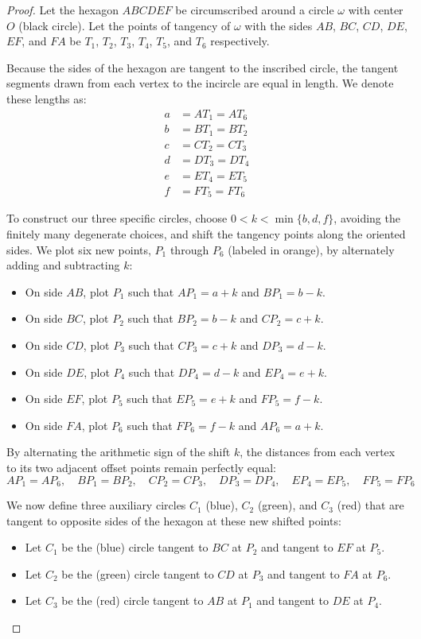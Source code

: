 \documentclass[reqno]{amsart}
\DeclareMathOperator{\1}{\textbf{1}}
\begin{document}
\begin{proof}


    Let the hexagon $ABCDEF$ be circumscribed around a circle $\omega$ with center $O$ (black circle). Let the points of tangency of $\omega$ with the sides $AB$, $BC$, $CD$, $DE$, $EF$, and $FA$ be $T_1$, $T_2$, $T_3$, $T_4$, $T_5$, and $T_6$ respectively.

Because the sides of the hexagon are tangent to the inscribed circle, the tangent segments drawn from each vertex to the incircle are equal in length. We denote these lengths as:
\begin{align*}
    a &= AT_1 = AT_6 \\
    b &= BT_1 = BT_2 \\
    c &= CT_2 = CT_3 \\
    d &= DT_3 = DT_4 \\
    e &= ET_4 = ET_5 \\
    f &= FT_5 = FT_6
\end{align*}

To construct our three specific circles, choose
$0<k<\min\{b,d,f\}$, avoiding the finitely many degenerate choices, and shift
the tangency points along the oriented sides. We plot six new points, $P_1$
through $P_6$ (labeled in orange), by alternately adding and subtracting $k$:
\begin{itemize}
    \item On side $AB$, plot $P_1$ such that $AP_1 = a + k$ and $BP_1 = b - k$.
    \item On side $BC$, plot $P_2$ such that $BP_2 = b - k$ and $CP_2 = c + k$.
    \item On side $CD$, plot $P_3$ such that $CP_3 = c + k$ and $DP_3 = d - k$.
    \item On side $DE$, plot $P_4$ such that $DP_4 = d - k$ and $EP_4 = e + k$.
    \item On side $EF$, plot $P_5$ such that $EP_5 = e + k$ and $FP_5 = f - k$.
    \item On side $FA$, plot $P_6$ such that $FP_6 = f - k$ and $AP_6 = a + k$.
\end{itemize}

By alternating the arithmetic sign of the shift $k$, the distances from each vertex to its two adjacent offset points remain perfectly equal: 
\[ AP_1 = AP_6, \quad BP_1 = BP_2, \quad CP_2 = CP_3, \quad DP_3 = DP_4, \quad EP_4 = EP_5, \quad FP_5 = FP_6 \]

We now define three auxiliary circles $C_1$ (blue), $C_2$ (green), and $C_3$ (red) that are tangent to opposite sides of the hexagon at these new shifted points:
\begin{itemize}
    \item Let $C_1$ be the (blue) circle tangent to $BC$ at $P_2$ and tangent to $EF$ at $P_5$.
    \item Let $C_2$ be the (green) circle tangent to $CD$ at $P_3$ and tangent to $FA$ at $P_6$.
    \item Let $C_3$ be the (red) circle tangent to $AB$ at $P_1$ and tangent to $DE$ at $P_4$.
\end{itemize}


\end{proof}
\end{document}
